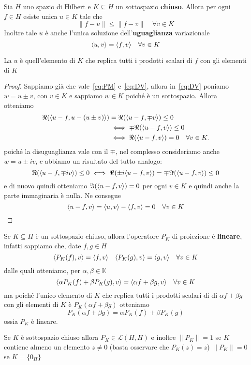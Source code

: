 \begin{theorem}\label{thm:proiezioni_sottospazi}
    Sia \(H\) uno spazio di Hilbert e \(K \subseteq H \) un sottospazio \textbf{chiuso}.
    Allora per ogni \(f \in H\) esiste unica \(u \in K\) tale che 
    \[
      \| f- u\|\le \|f - v\| \quad \forall v \in K
    \]
    Inoltre tale \(u\) è anche l'unica soluzione dell'\textbf{uguaglianza}
    variazionale
    \begin{equation}\label{eq:UV}
        {\left\langle u, v\right\rangle} = {\left\langle f, v\right\rangle} \quad \forall v \in K
    \end{equation}
\end{theorem}
\begin{remark}
    La \(u\) è quell'elemento di \(K\) che replica tutti i prodotti scalari di
    \(f\) con gli elementi di \(K\) 
\end{remark}
\begin{proof}
    Sappiamo già che vale~\eqref{eq:PM} e~\eqref{eq:DV}, allora in~\eqref{eq:DV}
    poniamo \(w = u \pm v\), con \(v \in K\) e sappiamo \(w \in K\) poiché è un
    sottospazio. Allora otteniamo
    \[
    \aligned
    \Re{(\Span{u - f, u - (u \pm v)})} 
        &= \Re{(\Span{u - f, \mp v})} \leq 0 \\
        &\iff \mp \Re{(\Span{u - f, v})} \leq 0 \\
        &\iff \Re{(\Span{u - f, v})} = 0 \quad \forall v \in K.
    \endaligned
    \]
    poiché la disuguaglianza vale con il \(\mp\), nel complesso consideriamo anche \(w = u \pm iv\),
    e abbiamo un risultato del tutto analogo:
    \[
        \Re{({\left\langle u-f, \mp iv\right\rangle} )} \le 0 \iff \Re{(\pm i{\left\langle u-f, v\right\rangle} )} =
        \mp \Im{({\left\langle u-f, v\right\rangle} )} \le 0
    \]
    e di nuovo quindi otteniamo \(\Im{({\left\langle u-f, v\right\rangle} )} = 0\) per ogni \(v \in
    K\) e quindi anche la parte immaginaria è nulla. Ne consegue
    \[
      {\left\langle u-f,v\right\rangle} = {\left\langle u,v\right\rangle}  -{\left\langle f, v\right\rangle}  = 0 \quad \forall v \in K 
    \]
\end{proof}
\begin{remark}
    Se \(K \subseteq H \) è un sottospazio chiuso, allora l'operatore \(P_K\) di
    proiezione è \textbf{lineare}, infatti sappiamo che, date \(f, g \in H\) 
    \[
      {\left\langle P_K{(f)},v\right\rangle} = {\left\langle f, v\right\rangle} \quad {\left\langle P_K{(g)}, v\right\rangle} = {\left\langle g, v\right\rangle}
      \quad \forall v \in K
    \]
    dalle quali otteniamo, per \(\alpha, \beta \in \mathbb{K}\) 
    \[
        {\left\langle\alpha P_K{(f)} + \beta P_K{(g)}, v\right\rangle} = {\left\langle\alpha f + \beta g,
        v\right\rangle} \quad \forall v \in K
    \]
    ma poiché l'unico elemento di \(K\) che replica tutti i prodotti scalari di
    di \(\alpha f + \beta g\) con gli elementi di \(K\) è \(P_K{(\alpha f +
    \beta g)}\) otteniamo 
    \[
        P_K{(\alpha f + \beta g)} = \alpha P_K{(f)} + \beta P_K{(g)}
    \]
    ossia \(P_K\) è lineare.
\end{remark}
\begin{remark}
    Se \(K\) è sottospazio chiuso allora \(P_K \in \mathcal{L}{(H, H)} \) e
    inoltre \(\|P_K\| = 1\) se \(K\) contiene almeno un elemento \(z \neq 0\)
    (basta osservare che \(P_K{(z)} = z\)) \(\|P_K\| = 0\) se \(K = \{0_H\} \) 
\end{remark}

